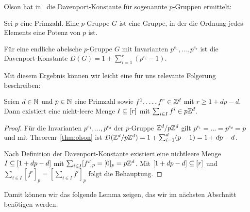 Olson hat in~\cite{Olson1969} die Davenport-Konstante für sogenannte $p$-Gruppen ermittelt:
\begin{definition}[$p$-Gruppe]
	Sei $p$ eine Primzahl.
	Eine $p$-Gruppe $G$ ist eine Gruppe, in der die Ordnung jedes Elements eine Potenz von $p$ ist.
\end{definition}

\begin{theorem}[Olson]\label{thm:olson}
	Für eine endliche abelsche $p$-Gruppe $G$ mit Invarianten $p^{e_1},\dots,p^{e_r}$ ist die Davenport-Konstante $D(G)=1+\sum_{i=1}^r(p^{e_i}-1)$. 
\end{theorem}

Mit diesem Ergebnis können wir leicht eine für uns relevante Folgerung beschreiben:

\begin{corollary}\label{cor:olson}
	Seien $d\in\mathbb{N}$ und $p\in\mathbb{N}$ eine Primzahl sowie $f^1,\dots,f^r\in\mathbb{Z}^d$ mit $r\geq 1+dp-d$. Dann existiert eine nicht-leere Menge $I\subseteq[r]$ mit $\sum_{i\in I}f^i\in p\mathbb{Z}^d$.
\end{corollary}
\begin{proof}
	Für die Invarianten $p^{e_1},\dots,p^{e_d}$ der $p$-Gruppe $\mathbb{Z}^d/p\mathbb{Z}^d$ gilt $p^{e_1}=\dots=p^{e_d}=p$ und mit Theorem~\ref{thm:olson} ist $D(\mathbb{Z}^d/p\mathbb{Z}^d)=1+\sum_{i=1}^d(p-1)=1+dp-d$.
	
	Nach Definition der Davenport-Konstante existiert eine nichtleere Menge $I\subseteq[1+dp-d]$ mit $\sum_{i\in I}[f^i]_p=[0]_p=p\mathbb{Z}^d$.
	Mit $[1+dp-d]\subseteq[r]$ und $\sum_{i\in I}[f^i]_p=[\sum_{i\in I}f^i]_p$ folgt die Behauptung.
\end{proof}

Damit können wir das folgende Lemma zeigen, das wir im nächsten Abschnitt benötigen werden:

